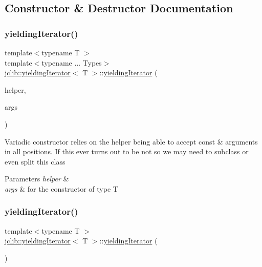 \subsection{Constructor \& Destructor Documentation}
\mbox{\label{classjclib_1_1yieldingIterator_a0dbcbd34a94bcce3144d2318fd7d8c09}} 
\subsubsection{\texorpdfstring{yielding\+Iterator()}{yieldingIterator()}\hspace{0.1cm}{\footnotesize\ttfamily [1/3]}}
{\footnotesize\ttfamily template$<$typename T $>$ \\
template$<$typename ... Types$>$ \\
\hyperlink{classjclib_1_1yieldingIterator}{jclib\+::yielding\+Iterator}$<$ T $>$\+::\hyperlink{classjclib_1_1yieldingIterator}{yielding\+Iterator} (\begin{DoxyParamCaption}\item[{class \hyperlink{classjclib_1_1yieldingIteratorHelper}{yielding\+Iterator\+Helper}$<$ T $>$ $\ast$}]{helper,  }\item[{const Types \&...}]{args }\end{DoxyParamCaption})\hspace{0.3cm}{\ttfamily [inline]}}

Variadic constructor relies on the helper being able to accept const \& arguments in all positions. If this ever turns out to be not so we may need to subclass or even split this class


\begin{DoxyParams}{Parameters}
{\em helper} & \\
\hline
{\em args} & for the constructor of type T \\
\hline
\end{DoxyParams}
\mbox{\label{classjclib_1_1yieldingIterator_a2dc7307fa736746412ad507c2acbd963}} 
\subsubsection{\texorpdfstring{yielding\+Iterator()}{yieldingIterator()}\hspace{0.1cm}{\footnotesize\ttfamily [2/3]}}
{\footnotesize\ttfamily template$<$typename T $>$ \\
\hyperlink{classjclib_1_1yieldingIterator}{jclib\+::yielding\+Iterator}$<$ T $>$\+::\hyperlink{classjclib_1_1yieldingIterator}{yielding\+Iterator} (\begin{DoxyParamCaption}{ }\end{DoxyParamCaption})\hspace{0.3cm}{\ttfamily [inline]}}

